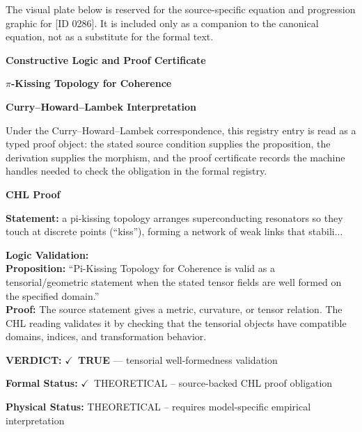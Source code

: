 \begingroup\footnotesize\sloppy
The visual plate below is reserved for the source-specific equation and progression graphic for [ID 0286]. It is included only as a companion to the canonical equation, not as a substitute for the formal text.
\par\endgroup
\ifTZPDarkEdition
{}
\fi

\clearpage
\begingroup\tzpsupportsetup
\noindent\textbf{\fontsize{10.8pt}{12.8pt}\selectfont [ID 0286] Constructive Logic and Proof Certificate}\par
\noindent\textbf{\fontsize{10pt}{12pt}\selectfont $\pi$-Kissing Topology for Coherence}\par
\vspace{0.45em}
\begingroup
\footnotesize
\setlength{\parskip}{0.22em}
\setlength{\parindent}{0pt}
\noindent\textbf{Curry--Howard--Lambek Interpretation}\par
Under the Curry--Howard--Lambek correspondence, this registry entry is read as a typed proof
object: the stated source condition supplies the proposition, the derivation supplies the
morphism, and the proof certificate records the machine handles needed to check the obligation
in the formal registry.

\vspace{0.45em}
\noindent\textbf{CHL Proof}\par
\textbf{Statement:} a pi-kissing topology arranges superconducting resonators so they touch at discrete
points (``kiss''), forming a network of weak links that stabili...

\textbf{Logic Validation:}\\
\textbf{Proposition:} ``Pi-Kissing Topology for Coherence is valid as a tensorial/geometric statement when the
stated tensor fields are well formed on the specified domain.''\\
\textbf{Proof:} The source statement gives a metric, curvature, or tensor relation. The CHL reading
validates it by checking that the tensorial objects have compatible domains, indices,
and transformation behavior.

\textbf{VERDICT:} \ensuremath{\checkmark}\ \textbf{TRUE} --- tensorial well-formedness validation

\textbf{Formal Status:} \ensuremath{\checkmark}\ THEORETICAL -- source-backed CHL proof obligation

\textbf{Physical Status:} THEORETICAL -- requires model-specific empirical interpretation
\par\vspace{0.45em}
\par
\ifTZPDarkEdition
{}
\fi
\endgroup
\endgroup
